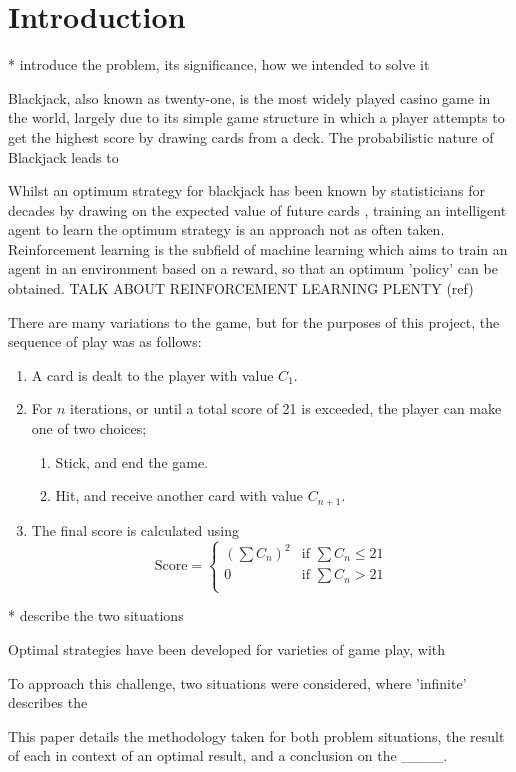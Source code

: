 \section{Introduction}

* introduce the problem, its significance, how we intended to solve it

Blackjack, also known as twenty-one, is the most widely played casino game in the world, largely due to its simple game structure in which a player attempts to get the highest score by drawing cards from a deck. The probabilistic nature of Blackjack leads to 

Whilst an optimum strategy for blackjack has been known by statisticians for decades by drawing on the expected value of future cards \cite{Baldwin01091956}, training an intelligent agent to learn the optimum strategy is an approach not as often taken. Reinforcement learning is the subfield of machine learning which aims to train an agent in an environment based on a reward, so that an optimum 'policy' can be obtained.  
TALK ABOUT REINFORCEMENT LEARNING PLENTY 
(ref)

There are many variations to the game, but for the purposes of this project, the sequence of play was as follows:

\begin{enumerate}
    \item A card is dealt to the player with value \(C_1\).
    \item For \(n\) iterations, or until a total score of 21 is exceeded, the player can make one of two choices;
    \begin{enumerate} 
        \item Stick, and end the game.
        \item Hit, and receive another card with value \(C_{n+1}\).
    \end{enumerate}
    \item The final score is calculated using
        \begin{equation}
            \text{Score} = 
            \begin{cases}
                (\sum C_n)^2 & \text{if } \sum C_n \le 21\\
                0            & \text{if } \sum C_n >   21\\
            \end{cases}
        \end{equation}
\end{enumerate}

* describe the two situations

Optimal strategies have been developed for varieties of game play, with 

To approach this challenge, two situations were considered, where 'infinite' describes the 

This paper details the methodology taken for both problem situations, the result of each in context of an optimal result, and a conclusion on the \_\_\_\_.

